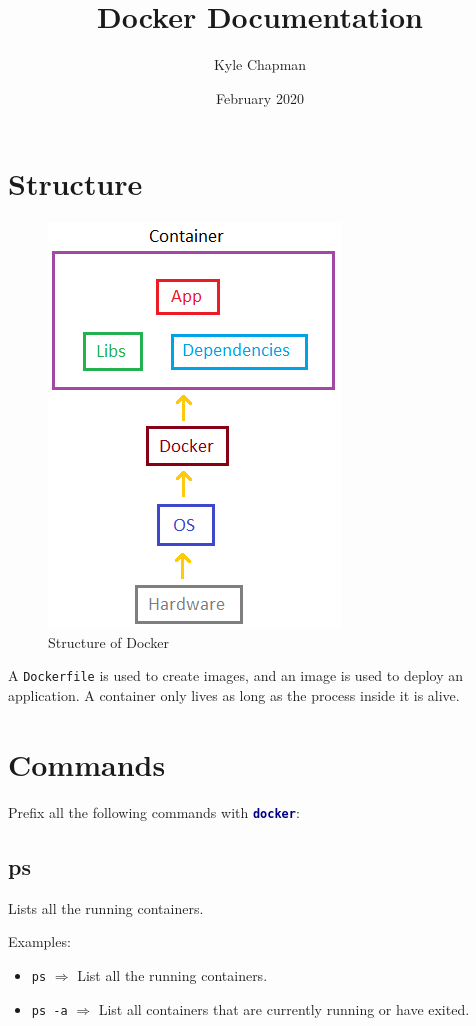 \documentclass[a4paper, 12pt]{article}
\title{Docker Documentation}
\author{Kyle Chapman}
\date{February 2020}
\newcommand{\bc}[2]{\textbf{\textcolor{#1}{#2}}}
\begin{document}
\maketitle
\tableofcontents
\clearpage

\section{Structure}

\begin{figure}[H]
	\centering
	\includegraphics[scale=0.6]{docker-setup.png}
	\caption{Structure of Docker}
\end{figure}

A \texttt{Dockerfile} is used to create images, and an image is used to deploy
an application. A container only lives as long as the process inside it is
alive.

\section{Commands}

Prefix all the following commands with \texttt{\bc{darkblue}{docker}}:

\subsection{ps}

Lists all the running containers.

\vspace{0.5em}
Examples:
\begin{itemize}
	\item \texttt{ps} $\Rightarrow$ List all the running containers.
	\item \texttt{ps -a} $\Rightarrow$ List all containers that are currently
	running or have exited.
\end{itemize}
\end{document}
